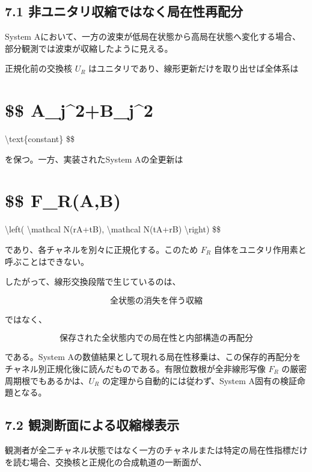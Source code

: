 \documentclass[
  a4paper,
  10pt]{article}
\begin{document}
\subsection{7.1
非ユニタリ収縮ではなく局在性再配分}\label{71-ux975eux30e6ux30cbux30bfux30eaux53ceux7e2eux3067ux306fux306aux304fux5c40ux5728ux6027ux518dux914dux5206}

System
Aにおいて、一方の波束が低局在状態から高局在状態へ変化する場合、部分観測では波束が収縮したように見える。

正規化前の交換核 \(U_R\)
はユニタリであり、線形更新だけを取り出せば全体系は

\section{\$\$
\textbar A\_j\textbar\^{}2+\textbar B\_j\textbar\^{}2}\label{-a_j2b_j2}

\textbackslash text\{constant\} \$\$

を保つ。一方、実装されたSystem Aの全更新は

\section{\$\$ F\_R(A,B)}\label{-f_rab}

\textbackslash left( \textbackslash mathcal N(rA+tB),
\textbackslash mathcal N(tA+rB) \textbackslash right) \$\$

であり、各チャネルを別々に正規化する。このため \(F_R\)
自体をユニタリ作用素と呼ぶことはできない。

したがって、線形交換段階で生じているのは、

\[
\text{全状態の消失を伴う収縮}
\]

ではなく、

\[
\text{保存された全状態内での局在性と内部構造の再配分}
\]

である。System
Aの数値結果として現れる局在性移乗は、この保存的再配分をチャネル別正規化後に読んだものである。有限位数根が全非線形写像
\(F_R\) の厳密周期根でもあるかは、\(U_R\)
の定理から自動的には従わず、System A固有の検証命題となる。

\subsection{7.2
観測断面による収縮様表示}\label{72-ux89b3ux6e2cux65adux9762ux306bux3088ux308bux53ceux7e2eux69d8ux8868ux793a}

観測者が全二チャネル状態ではなく一方のチャネルまたは特定の局在性指標だけを読む場合、交換核と正規化の合成軌道の一断面が、
\end{document}
